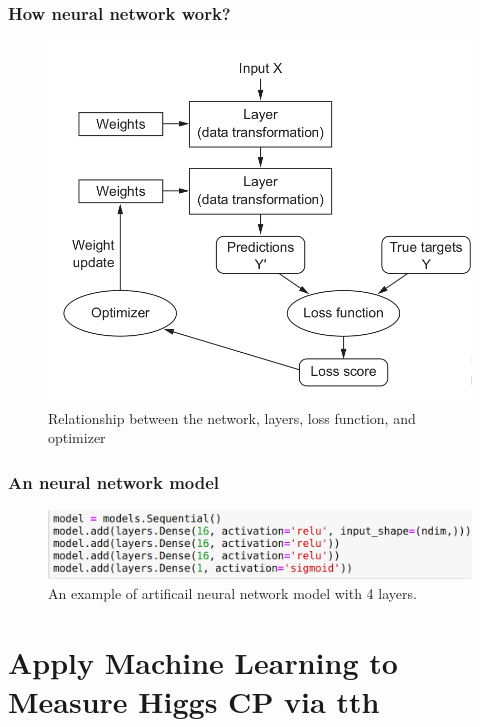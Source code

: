 \documentclass{beamer}
\begin{document}
\begin{frame}
\frametitle{How neural network work?}
\begin{figure}
\includegraphics[scale=0.25]{./figures/interaction.png}
\caption{Relationship between the network, layers, loss function, and optimizer}
\end{figure}
\end{frame}

\begin{frame}
\frametitle{An neural network model}
\begin{figure}
\includegraphics[scale=0.25]{./figures/model.png}
\caption{An example of artificail neural network model with 4 layers.}
\end{figure}
\end{frame}


\section{Apply Machine Learning to Measure Higgs CP via tth}
\end{document}
